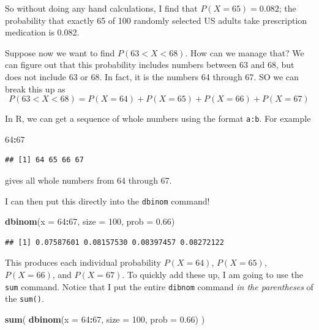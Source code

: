 \documentclass[
]{book}
\newenvironment{Shaded}{\begin{snugshade}}{\end{snugshade}}
\newcommand{\AttributeTok}[1]{\textcolor[rgb]{0.13,0.29,0.53}{#1}}
\newcommand{\DecValTok}[1]{\textcolor[rgb]{0.00,0.00,0.81}{#1}}
\newcommand{\FloatTok}[1]{\textcolor[rgb]{0.00,0.00,0.81}{#1}}
\newcommand{\FunctionTok}[1]{\textcolor[rgb]{0.13,0.29,0.53}{\textbf{#1}}}
\newcommand{\NormalTok}[1]{#1}
\newcommand{\SpecialCharTok}[1]{\textcolor[rgb]{0.81,0.36,0.00}{\textbf{#1}}}
\begin{document}
So without doing any hand calculations, I find that \(P(X=65) = 0.082\); the probability that exactly 65 of 100 randomly selected US adults take prescription medication is 0.082.

Suppose now we want to find \(P(63 < X < 68)\). How can we manage that? We can figure out that this probability includes numbers between 63 and 68, but does not include 63 or 68. In fact, it is the numbers 64 through 67. SO we can break this up as \[ P(63 < X < 68) = P(X=64) + P(X=65)+ P(X=66) + P(X=67) \]

In R, we can get a sequence of whole numbers using the format \texttt{a:b}. For example

\begin{Shaded}
\begin{Highlighting}[]
\DecValTok{64}\SpecialCharTok{:}\DecValTok{67}
\end{Highlighting}
\end{Shaded}

\begin{verbatim}
## [1] 64 65 66 67
\end{verbatim}

gives all whole numbers from 64 through 67.

I can then put this directly into the \texttt{dbinom} command!

\begin{Shaded}
\begin{Highlighting}[]
\FunctionTok{dbinom}\NormalTok{(}\AttributeTok{x =} \DecValTok{64}\SpecialCharTok{:}\DecValTok{67}\NormalTok{, }\AttributeTok{size =} \DecValTok{100}\NormalTok{, }\AttributeTok{prob =} \FloatTok{0.66}\NormalTok{)}
\end{Highlighting}
\end{Shaded}

\begin{verbatim}
## [1] 0.07587601 0.08157530 0.08397457 0.08272122
\end{verbatim}

This produces each individual probability \(P(X=64)\), \(P(X=65)\), \(P(X=66)\), and \(P(X=67)\). To quickly add these up, I am going to use the \texttt{sum} command. Notice that I put the entire \texttt{dibnom} command \emph{in the parentheses} of the \texttt{sum()}.

\begin{Shaded}
\begin{Highlighting}[]
\FunctionTok{sum}\NormalTok{(}
  \FunctionTok{dbinom}\NormalTok{(}\AttributeTok{x =} \DecValTok{64}\SpecialCharTok{:}\DecValTok{67}\NormalTok{, }\AttributeTok{size =} \DecValTok{100}\NormalTok{, }\AttributeTok{prob =} \FloatTok{0.66}\NormalTok{)}
\NormalTok{)}
\end{Highlighting}
\end{Shaded}
\end{document}
